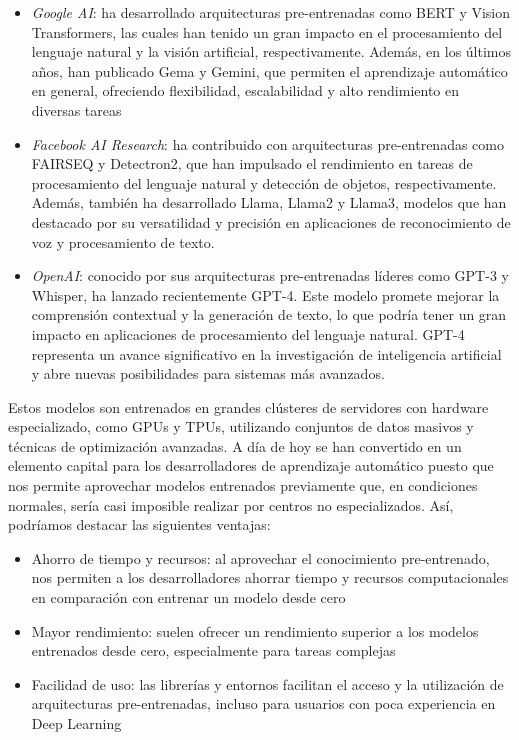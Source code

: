\documentclass[
  a4paper,
  DIV=11,
  numbers=noendperiod]{scrreprt}
\providecommand{\tightlist}{%
  \setlength{\itemsep}{0pt}\setlength{\parskip}{0pt}}\usepackage{longtable,booktabs,array}
\begin{document}
\begin{itemize}
\tightlist
\item
  \emph{Google AI}: ha desarrollado arquitecturas pre-entrenadas como
  BERT y Vision Transformers, las cuales han tenido un gran impacto en
  el procesamiento del lenguaje natural y la visión artificial,
  respectivamente. Además, en los últimos años, han publicado Gema y
  Gemini, que permiten el aprendizaje automático en general, ofreciendo
  flexibilidad, escalabilidad y alto rendimiento en diversas tareas
\item
  \emph{Facebook AI Research}: ha contribuido con arquitecturas
  pre-entrenadas como FAIRSEQ y Detectron2, que han impulsado el
  rendimiento en tareas de procesamiento del lenguaje natural y
  detección de objetos, respectivamente. Además, también ha desarrollado
  Llama, Llama2 y Llama3, modelos que han destacado por su versatilidad
  y precisión en aplicaciones de reconocimiento de voz y procesamiento
  de texto.
\item
  \emph{OpenAI}: conocido por sus arquitecturas pre-entrenadas líderes
  como GPT-3 y Whisper, ha lanzado recientemente GPT-4. Este modelo
  promete mejorar la comprensión contextual y la generación de texto, lo
  que podría tener un gran impacto en aplicaciones de procesamiento del
  lenguaje natural. GPT-4 representa un avance significativo en la
  investigación de inteligencia artificial y abre nuevas posibilidades
  para sistemas más avanzados.
\end{itemize}

Estos modelos son entrenados en grandes clústeres de servidores con
hardware especializado, como GPUs y TPUs, utilizando conjuntos de datos
masivos y técnicas de optimización avanzadas. A día de hoy se han
convertido en un elemento capital para los desarrolladores de
aprendizaje automático puesto que nos permite aprovechar modelos
entrenados previamente que, en condiciones normales, sería casi
imposible realizar por centros no especializados. Así, podríamos
destacar las siguientes ventajas:

\begin{itemize}
\tightlist
\item
  Ahorro de tiempo y recursos: al aprovechar el conocimiento
  pre-entrenado, nos permiten a los desarrolladores ahorrar tiempo y
  recursos computacionales en comparación con entrenar un modelo desde
  cero
\item
  Mayor rendimiento: suelen ofrecer un rendimiento superior a los
  modelos entrenados desde cero, especialmente para tareas complejas
\item
  Facilidad de uso: las librerías y entornos facilitan el acceso y la
  utilización de arquitecturas pre-entrenadas, incluso para usuarios con
  poca experiencia en Deep Learning
\end{itemize}
\end{document}
